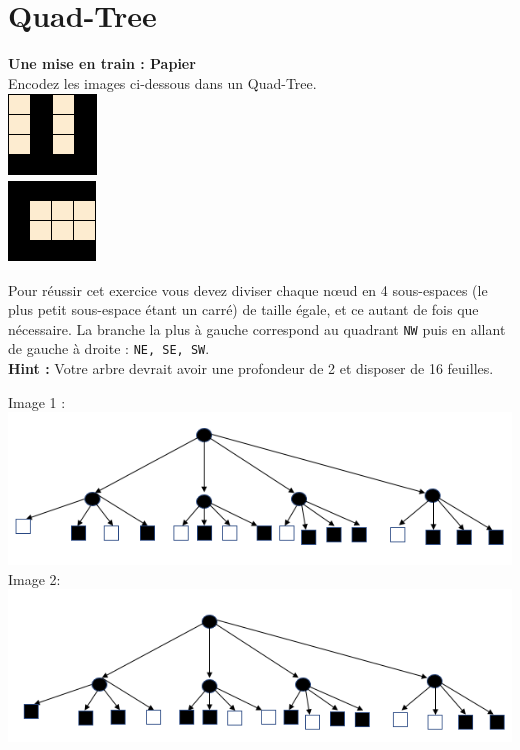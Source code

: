 \newpage

\section{ Quad-Tree}
\begin{Exercice}[10 minutes]\textbf{Une mise en train : Papier}\\

Encodez les images ci-dessous dans un Quad-Tree.\\

\includegraphics[]{Ressources/Quad-Tree 1.PNG}\\
\includegraphics[]{Ressources/Quad-Tree 2.PNG}

\begin{conseil}
   Pour réussir cet exercice vous devez diviser chaque nœud en 4 sous-espaces (le plus petit sous-espace étant un carré) de taille égale, et ce autant de fois que nécessaire. La branche la plus à gauche correspond au quadrant \lstinline{NW} puis en allant de gauche à droite : \lstinline{NE, SE, SW}. \\
    
    \textbf{Hint :} Votre arbre devrait avoir une profondeur de 2 et disposer de 16 feuilles.
\end{conseil}
\begin{solution}
Image 1 :\\
    \includegraphics[scale=0.65]{Solutions/Quad-Tree 1 solution.PNG}\\
    
Image 2: \\
    \includegraphics[scale=0.65]{Solutions/Quad-Tree 2 solution.PNG}
\end{solution}
\end{Exercice}
